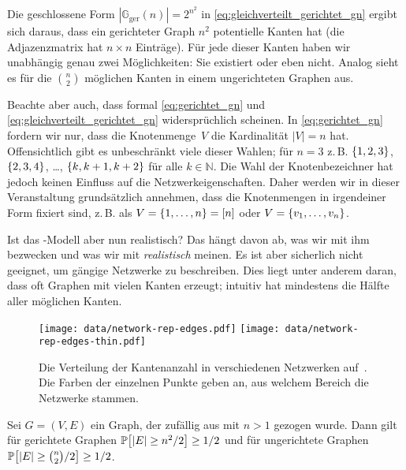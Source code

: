 Die geschlossene Form $| \mathbb G_\text{ger}(n) | = 2^{n^2}$ in \cref{eq:gleichverteilt_gerichtet_gn} ergibt sich daraus, dass ein gerichteter Graph $n^2$ potentielle Kanten hat (die Adjazenzmatrix hat $n \times n$ Einträge).
Für jede dieser Kanten haben wir unabhängig genau zwei Möglichkeiten: Sie existiert oder eben nicht.
Analog sieht es für die $\binom n 2$ möglichen Kanten in einem ungerichteten Graphen aus.

Beachte aber auch, dass formal \cref{eq:gerichtet_gn} und \cref{eq:gleichverteilt_gerichtet_gn} widersprüchlich scheinen.
In \cref{eq:gerichtet_gn} fordern wir nur, dass die Knotenmenge~$V$ die Kardinalität $|V| = n$ hat.
Offensichtlich gibt es unbeschränkt viele dieser Wahlen; für $n=3$ z.\,B. $\left\{1,2,3\right\}$, $\left\{2,3,4\right\}$, \ldots, $\left\{k, k+1, k+2\right\}$ für alle $k \in \mathbb N$.
Die Wahl der Knotenbezeichner hat jedoch keinen Einfluss auf die Netzwerkeigenschaften.
Daher werden wir in dieser Veranstaltung grundsätzlich annehmen, dass die Knotenmengen in irgendeiner Form fixiert sind, z.\,B. als $V = \left\{1, \ldots, n\right\} = [n]$ oder $V = \left\{v_1, \ldots, v_n\right\}$.

\bigskip

Ist das \Gn-Modell aber nun realistisch?
Das hängt davon ab, was wir mit ihm bezwecken und was wir mit \emph{realistisch} meinen.
Es ist aber sicherlich nicht geeignet, um gängige Netzwerke zu beschreiben.
Dies liegt unter anderem daran, dass \Gn oft Graphen mit vielen Kanten erzeugt;
intuitiv hat  mindestens die Hälfte aller möglichen Kanten.

\begin{figure}[t]
    \begin{center}
        \texttt{[image: data/network-rep-edges.pdf]}%
        \texttt{[image: data/network-rep-edges-thin.pdf]}%
    \end{center}
    \caption{
        Die Verteilung der Kantenanzahl in verschiedenen Netzwerken auf~\cite{networkrepository}.
        Die Farben der einzelnen Punkte geben an, aus welchem Bereich die Netzwerke stammen.
    }
    \label{fig:kantenanzahl}
\end{figure}


\begin{observation}
    Sei $G = (V,E)$ ein Graph, der zufällig aus \Gn mit $n > 1$ gezogen wurde.
    Dann gilt für gerichtete Graphen $\mathbb{P}\!\left[|E| \ge n^2 / 2\right] \ge 1/2$ und für ungerichtete Graphen $\mathbb{P}\!\left[|E| \ge \binom{n}{2} / 2\right] \ge 1/2$.
\end{observation}

